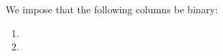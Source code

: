 We impose that the following columns be binary:
\begin{multicols}{2}
\begin{enumerate}
\item \dataSizeTotal{}
\item \logLogsData{}
\end{enumerate}
\end{multicols}
